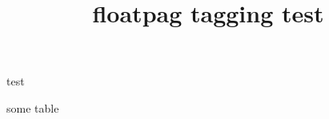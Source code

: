 \documentclass{article}
\title{floatpag tagging test}
\begin{document}
test

\begin{table}
some table
\end{table}
\end{document}
